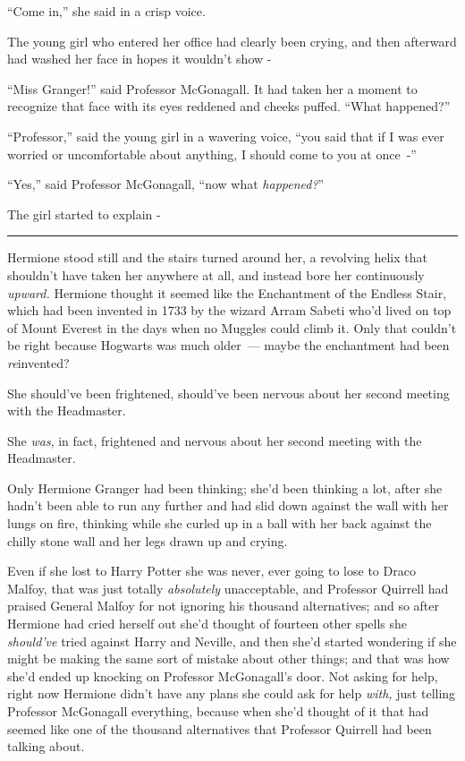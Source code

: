 ``Come in,'' she said in a crisp voice.

The young girl who entered her office had clearly been crying, and then afterward had washed her face in hopes it wouldn't show -

``Miss Granger!'' said Professor McGonagall. It had taken her a moment to recognize that face with its eyes reddened and cheeks puffed. ``What happened?''

``Professor,'' said the young girl in a wavering voice, ``you said that if I was ever worried or uncomfortable about anything, I should come to you at once~-''

``Yes,'' said Professor McGonagall, ``now what \emph{happened?}''

The girl started to explain -

\begin{center}\rule{3in}{0.4pt}\end{center}

Hermione stood still and the stairs turned around her, a revolving helix that shouldn't have taken her anywhere at all, and instead bore her continuously \emph{upward.} Hermione thought it seemed like the Enchantment of the Endless Stair, which had been invented in 1733 by the wizard Arram Sabeti who'd lived on top of Mount Everest in the days when no Muggles could climb it. Only that couldn't be right because Hogwarts was much older~--- maybe the enchantment had been \emph{re}invented?

She should've been frightened, should've been nervous about her second meeting with the Headmaster.

She \emph{was}, in fact, frightened and nervous about her second meeting with the Headmaster.

Only Hermione Granger had been thinking; she'd been thinking a lot, after she hadn't been able to run any further and had slid down against the wall with her lungs on fire, thinking while she curled up in a ball with her back against the chilly stone wall and her legs drawn up and crying.

Even if she lost to Harry Potter she was never, ever going to lose to Draco Malfoy, that was just totally \emph{absolutely} unacceptable, and Professor Quirrell had praised General Malfoy for not ignoring his thousand alternatives; and so after Hermione had cried herself out she'd thought of fourteen other spells she \emph{should've} tried against Harry and Neville, and then she'd started wondering if she might be making the same sort of mistake about other things; and that was how she'd ended up knocking on Professor McGonagall's door. Not asking for help, right now Hermione didn't have any plans she could ask for help \emph{with,} just telling Professor McGonagall everything, because when she'd thought of it that had seemed like one of the thousand alternatives that Professor Quirrell had been talking about.

